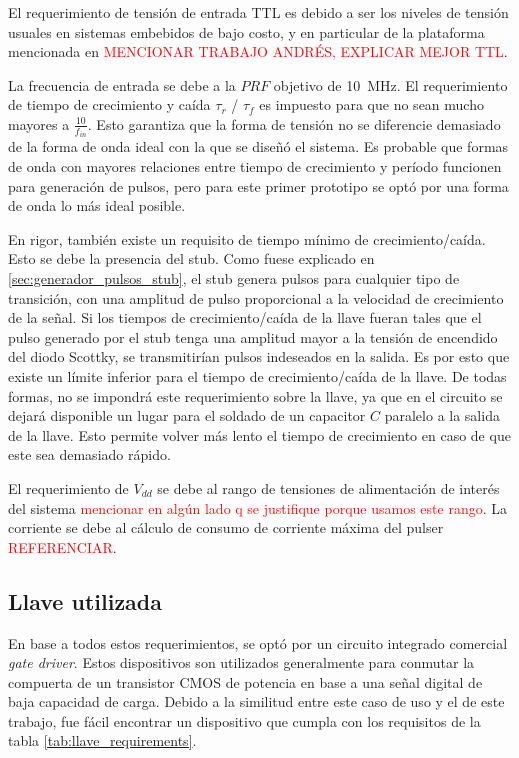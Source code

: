 El requerimiento de tensión de entrada TTL es debido a ser los niveles de
tensión usuales en sistemas embebidos de bajo costo, y en particular de la
plataforma mencionada en \textcolor{red}{MENCIONAR TRABAJO ANDRÉS, EXPLICAR
MEJOR TTL}.

La frecuencia de  entrada se debe a la $PRF$ objetivo de \qty{10}{\mega\hertz}.
El requerimiento de tiempo de crecimiento y caída $\tau_{r}$ / $\tau_{f}$ es
impuesto para que no sean mucho mayores a $\frac{10}{f_{in}}$. Esto garantiza
que la forma de tensión no se diferencie demasiado de la forma de onda ideal con
la que se diseñó el sistema. Es probable que formas de onda con mayores
relaciones entre tiempo de crecimiento y período funcionen para generación de
pulsos, pero para este primer prototipo se optó por una forma de onda lo más
ideal posible.

En rigor, también existe un requisito de tiempo mínimo de crecimiento/caída.
Esto se debe la presencia del stub. Como fuese explicado en
\ref{sec:generador_pulsos_stub}, el stub genera pulsos para cualquier tipo de
transición, con una amplitud de pulso proporcional a la velocidad de crecimiento
de la señal. Si los tiempos de crecimiento/caída de la llave fueran tales que el
pulso generado por el stub tenga una amplitud mayor a la tensión de encendido
del diodo Scottky, se transmitirían pulsos indeseados en la salida. Es por esto que
existe un límite inferior para el tiempo de crecimiento/caída de la llave. De
todas formas, no se impondrá  este requerimiento sobre la llave, ya que en el
circuito se dejará disponible un lugar para el soldado de un capacitor $C$
paralelo a la salida de la llave. Esto permite volver más lento el tiempo de
crecimiento en caso de que este sea demasiado rápido.

El requerimiento de $V_{dd}$ se debe al rango de tensiones de alimentación de
interés del sistema \textcolor{red}{mencionar en algún lado q se justifique
porque usamos este rango}. La corriente se debe al cálculo de consumo de
corriente máxima del pulser \textcolor{red}{REFERENCIAR}.

\subsection{Llave utilizada}

En base a todos estos requerimientos, se optó por un circuito integrado
comercial \textit{gate driver}. Estos dispositivos son utilizados generalmente
para conmutar la compuerta de un transistor CMOS de potencia en base a  una
señal digital de baja capacidad de carga. Debido a la similitud entre este caso
de uso y el de este trabajo, fue fácil encontrar un dispositivo que cumpla con
los requisitos de la tabla \ref{tab:llave_requirements}.


